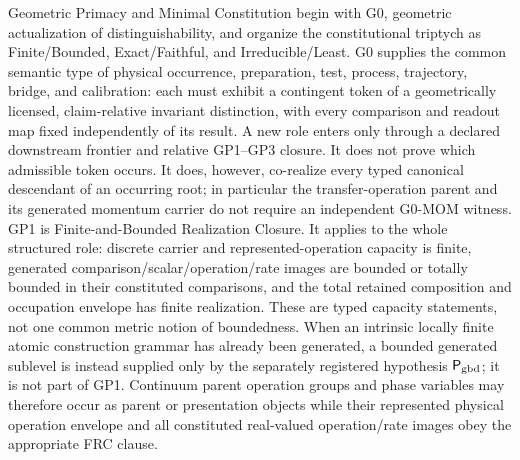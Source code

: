 \documentclass[12pt,a4paper]{article}
\begin{document}
Geometric Primacy and Minimal Constitution begin with G0, geometric
actualization of distinguishability, and organize the constitutional triptych as
Finite/Bounded, Exact/Faithful, and Irreducible/Least.  G0 supplies the common
semantic type of physical occurrence, preparation, test, process, trajectory,
bridge, and calibration: each must exhibit a contingent token of a
geometrically licensed, claim-relative invariant distinction, with every
comparison and readout map fixed independently of its result.  A new role
enters only through a declared downstream frontier and relative GP1--GP3
closure.  It does not prove which admissible token occurs.  It does, however,
co-realize every typed canonical descendant of an occurring root; in
particular the transfer-operation parent and its generated momentum carrier
do not require an independent G0-MOM witness.  GP1 is
Finite-and-Bounded Realization Closure.  It applies to the whole structured
role: discrete carrier and represented-operation capacity is
finite, generated comparison/scalar/operation/rate images are bounded or
totally bounded in their constituted comparisons, and the total retained
composition and occupation envelope has finite realization.  These are typed
capacity statements, not one common metric notion of boundedness.  When an
intrinsic locally finite atomic construction grammar has already been
generated, a bounded generated sublevel is instead supplied only by the
separately registered hypothesis \(\mathsf P_{\rm gbd}\); it is not part of
GP1.  Continuum parent
operation groups and phase variables may therefore occur as parent or
presentation objects while their represented physical operation envelope and
all constituted real-valued operation/rate images obey the appropriate FRC
clause.
\end{document}
